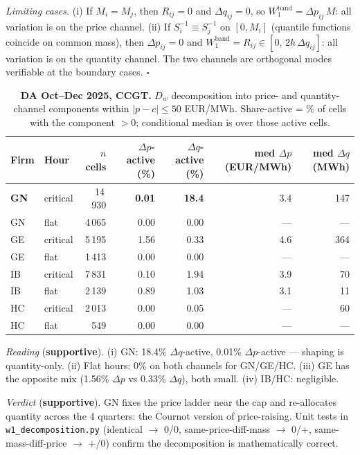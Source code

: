 \documentclass[11pt,a4paper]{article}
\newcommand{\code}[1]{\nolinkurl{#1}}
\begin{document}
\emph{Limiting cases.} (i) If $M_i = M_j$, then $R_{ij}=0$ and $\Delta q_{ij}=0$, so $W^{\text{band}}_1 = \Delta p_{ij}\,M$: all variation is on the price channel. (ii) If $S_i^{-1} \equiv S_j^{-1}$ on $[0, M_i]$ (quantile functions coincide on common mass), then $\Delta p_{ij}=0$ and $W^{\text{band}}_1 = R_{ij} \in [0,\,2h\,\Delta q_{ij}]$: all variation is on the quantity channel. The two channels are orthogonal modes verifiable at the boundary cases. \hfill$\square$

\begin{table}[H]
\centering
\caption{\textbf{DA Oct--Dec 2025, CCGT.} $D_w$ decomposition into price- and quantity-channel components within $|p - c| \le 50$ EUR/MWh. Share-active = \% of cells with the component $> 0$; conditional median is over those active cells.}
\label{tab:dw_decomp}
\begin{tabular}{l l r r r r r}
\toprule
Firm & Hour & $n$ cells & $\Delta p$-active (\%) & $\Delta q$-active (\%) & med $\Delta p$ (EUR/MWh) & med $\Delta q$ (MWh) \\
\midrule
\textbf{GN} & critical & 14\,930 & \textbf{0.01} & \textbf{18.4} & 3.4 & 147 \\
GN & flat     &  4\,065 & 0.00 & 0.00 & --- & --- \\
\addlinespace
GE & critical &  5\,195 & 1.56 & 0.33 & 4.6 & 364 \\
GE & flat     &  1\,413 & 0.00 & 0.00 & --- & --- \\
\addlinespace
IB & critical &  7\,831 & 0.10 & 1.94 & 3.9 &  70 \\
IB & flat     &  2\,139 & 0.89 & 1.03 & 3.1 &  11 \\
\addlinespace
HC & critical &  2\,013 & 0.00 & 0.05 & --- &  60 \\
HC & flat     &    549 & 0.00 & 0.00 & --- & --- \\
\bottomrule
\end{tabular}
\end{table}

\textit{Reading} (\textbf{supportive}). (i) GN: 18.4\% $\Delta q$-active, 0.01\% $\Delta p$-active --- shaping is quantity-only. (ii) Flat hours: 0\% on both channels for GN/GE/HC. (iii) GE has the opposite mix (1.56\% $\Delta p$ vs 0.33\% $\Delta q$), both small. (iv) IB/HC: negligible.

\textit{Verdict} (\textbf{supportive}). GN fixes the price ladder near the cap and re-allocates quantity across the 4 quarters: the Cournot version of price-raising. Unit tests in \code{w1_decomposition.py} (identical $\to$ 0/0, same-price-diff-mass $\to$ 0/$+$, same-mass-diff-price $\to$ $+$/0) confirm the decomposition is mathematically correct.
\end{document}
